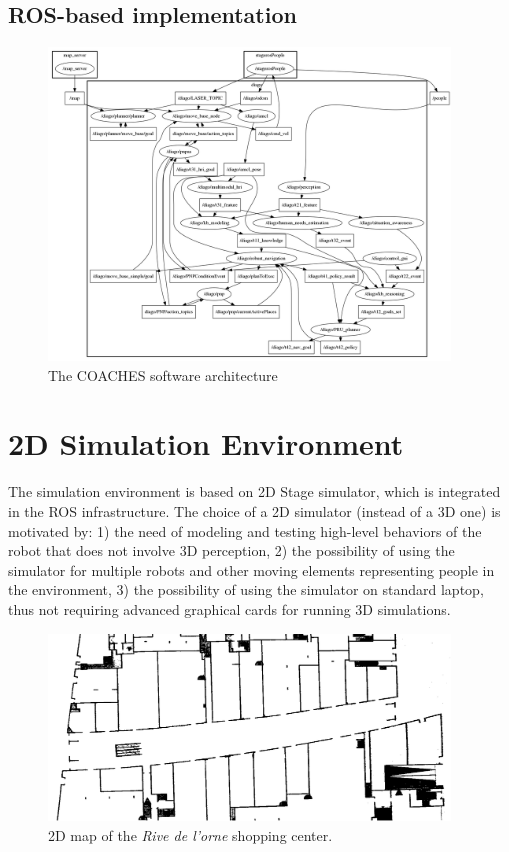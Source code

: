\documentclass{article}
\begin{document}
\subsection {ROS-based implementation}

\begin{figure}
\includegraphics[width=0.95\textwidth]{noname.png}
\caption{The COACHES software architecture}
\label{fig:archi}
\end{figure}

\section{2D Simulation Environment}

The simulation environment is based on 2D Stage simulator, which is integrated in the ROS infrastructure. The choice of a 2D simulator (instead of a 3D one) is motivated by: 1) the need of modeling and testing high-level behaviors of the robot that does not involve 3D perception, 2) the possibility of using the simulator for multiple robots and other moving elements representing people in the environment, 3) the possibility of using the simulator on standard laptop, thus not requiring advanced graphical cards for running 3D simulations.

\begin{figure}
\includegraphics[width=0.95\textwidth]{Rive1.png}
\caption{2D map of the \emph{Rive de l'orne} shopping center.}
\label{fig:stage}
\end{figure}
\end{document}

